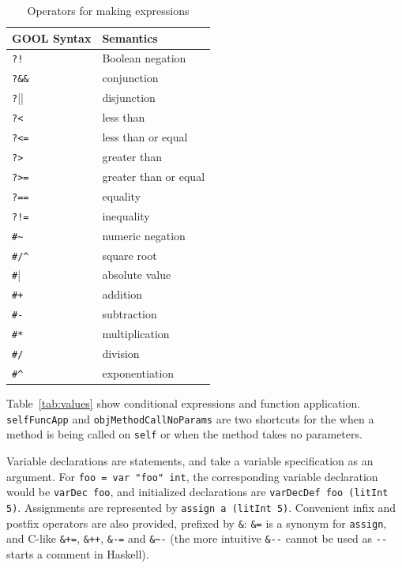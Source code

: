 \documentclass[sigplan,review,anonymous,prologue,dvipsnames]{acmart}
\begin{document}
\begin{table}[htb]
  \caption{Operators for making expressions}
  \begin{tabular}{p{} p{}}
    \textbf{GOOL Syntax} & \textbf{Semantics} \\
    \midrule
    \verb|?!| & Boolean negation \\
    \verb|?&&| & conjunction \\
    \verb|?||| & disjunction \\
    \verb|?<| & less than \\
    \verb|?<=| & less than or equal \\
    \verb|?>| & greater than \\
    \verb|?>=| & greater than or equal \\
    \verb|?==| & equality \\
    \verb|?!=| & inequality \\
    \verb|#~| & numeric negation \\
    \verb|#/^| & square root \\
    \verb|#|| & absolute value \\
    \verb|#+| & addition \\
    \verb|#-| & subtraction \\
    \verb|#*| & multiplication \\
    \verb|#/| & division \\
    \verb|#^| & exponentiation \\
  \end{tabular}
  \label{tab:operators}
\end{table}

Table~\ref{tab:values} show conditional expressions and function application.
\verb|selfFuncApp| and \verb|objMethodCallNoParams| are two shortcuts for the
when a method is being called on \verb|self| or when the method
takes no parameters.

Variable declarations are statements, and take a variable specification
as an argument. For \verb|foo = var "foo" int|, the corresponding variable
declaration would be \verb|varDec foo|, and initialized declarations are
\verb|varDecDef foo (litInt 5)|.
Assignments are represented by \verb|assign a (litInt 5)|. Convenient
infix and postfix operators are also provided, prefixed by \verb|&|:
\verb|&=| is a synonym for \verb|assign|, and C-like
\verb|&+=|, \verb|&++|, \verb|&-=| and \verb|&~-| (the more intuitive
\verb|&--| cannot be used as \verb|--| starts a comment in Haskell).
\end{document}

